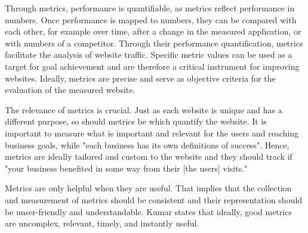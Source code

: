 Through metrics, performance is quantifiable, as metrics reflect performance in numbers.
Once performance is mapped to numbers, they can be compared with each other, for example over time, after a change in the measured application,  or with numbers of a competitor. %
Through their performance quantification, metrics facilitate the analysis of website traffic.
Specific metric values can be used as a target for goal achievement and are therefore a critical instrument for improving websites. %
Ideally, metrics are precise and serve as objective criteria for the evaluation of the measured website. %






The relevance of metrics is crucial.
Just as each website is unique and has a different purpose, so should metrics be which quantify the website.
It is important to measure what is important and relevant for the users and reaching business goals, while "each business has its own definitions of success". %
Hence, metrics are ideally tailored and custom to the website and they should track if "your business benefited in some way from their [the users] visits." %




Metrics are only helpful when they are useful.
That implies that the collection and measurement of metrics should be consistent and their representation should be unser-friendly and understandable. %
Kumar states that ideally, good metrics are uncomplex, relevant, timely, and instantly useful.  \\%



